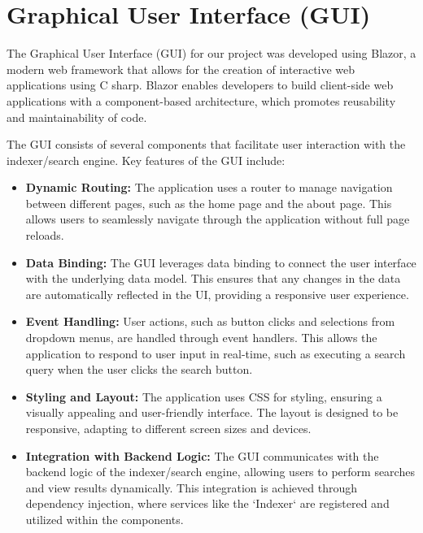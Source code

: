 \documentclass{article}
\begin{document}
\section{Graphical User Interface (GUI)}
The Graphical User Interface (GUI) for our project was developed using Blazor, a modern web framework that allows for the creation of interactive web applications using C sharp. Blazor enables developers to build client-side web applications with a component-based architecture, which promotes reusability and maintainability of code.

The GUI consists of several components that facilitate user interaction with the indexer/search engine. Key features of the GUI include:

\begin{itemize}
    \item \textbf{Dynamic Routing:} The application uses a router to manage navigation between different pages, such as the home page and the about page. This allows users to seamlessly navigate through the application without full page reloads.
    \item \textbf{Data Binding:} The GUI leverages data binding to connect the user interface with the underlying data model. This ensures that any changes in the data are automatically reflected in the UI, providing a responsive user experience.
    \item \textbf{Event Handling:} User actions, such as button clicks and selections from dropdown menus, are handled through event handlers. This allows the application to respond to user input in real-time, such as executing a search query when the user clicks the search button.
    \item \textbf{Styling and Layout:} The application uses CSS for styling, ensuring a visually appealing and user-friendly interface. The layout is designed to be responsive, adapting to different screen sizes and devices.
    \item \textbf{Integration with Backend Logic:} The GUI communicates with the backend logic of the indexer/search engine, allowing users to perform searches and view results dynamically. This integration is achieved through dependency injection, where services like the `Indexer` are registered and utilized within the components.
\end{itemize}
\end{document}
